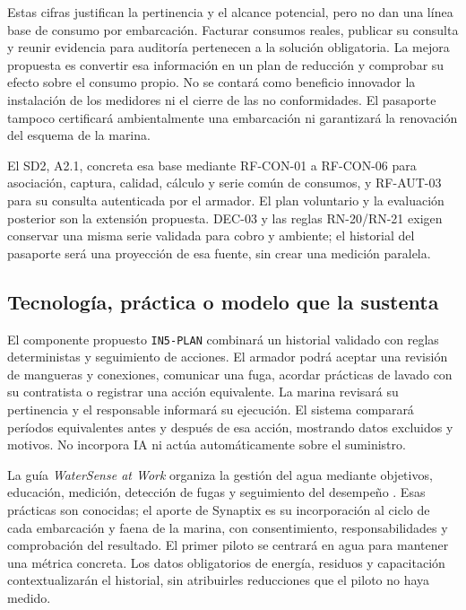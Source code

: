 Estas cifras justifican la pertinencia y el alcance potencial, pero no dan una línea base de consumo por embarcación. Facturar consumos reales, publicar su consulta y reunir evidencia para auditoría pertenecen a la solución obligatoria. La mejora propuesta es convertir esa información en un plan de reducción y comprobar su efecto sobre el consumo propio. No se contará como beneficio innovador la instalación de los medidores ni el cierre de las no conformidades. El pasaporte tampoco certificará ambientalmente una embarcación ni garantizará la renovación del esquema de la marina.

El SD2, A2.1, concreta esa base mediante RF-CON-01 a RF-CON-06 para asociación, captura, calidad, cálculo y serie común de consumos, y RF-AUT-03 para su consulta autenticada por el armador. El plan voluntario y la evaluación posterior son la extensión propuesta. DEC-03 y las reglas RN-20/RN-21 exigen conservar una misma serie validada para cobro y ambiente; el historial del pasaporte será una proyección de esa fuente, sin crear una medición paralela.

\subsection{Tecnología, práctica o modelo que la sustenta}

El componente propuesto \texttt{IN5-PLAN} combinará un historial validado con reglas deterministas y seguimiento de acciones. El armador podrá aceptar una revisión de mangueras y conexiones, comunicar una fuga, acordar prácticas de lavado con su contratista o registrar una acción equivalente. La marina revisará su pertinencia y el responsable informará su ejecución. El sistema comparará períodos equivalentes antes y después de esa acción, mostrando datos excluidos y motivos. No incorpora IA ni actúa automáticamente sobre el suministro.

La guía \textit{WaterSense at Work} organiza la gestión del agua mediante objetivos, educación, medición, detección de fugas y seguimiento del desempeño \parencite{epa-watersense-work}. Esas prácticas son conocidas; el aporte de Synaptix es su incorporación al ciclo de cada embarcación y faena de la marina, con consentimiento, responsabilidades y comprobación del resultado. El primer piloto se centrará en agua para mantener una métrica concreta. Los datos obligatorios de energía, residuos y capacitación contextualizarán el historial, sin atribuirles reducciones que el piloto no haya medido.


